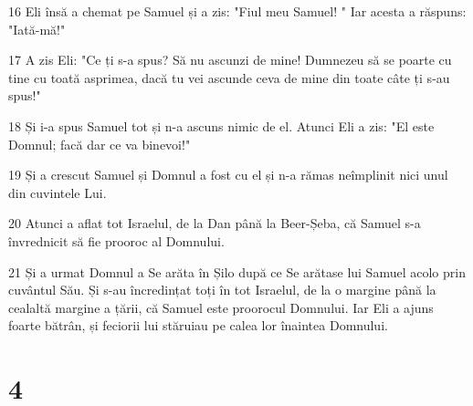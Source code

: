 \par 16 Eli însă a chemat pe Samuel și a zis: "Fiul meu Samuel! " Iar acesta a răspuns: "Iată-mă!"
\par 17 A zis Eli: "Ce ți s-a spus? Să nu ascunzi de mine! Dumnezeu să se poarte cu tine cu toată asprimea, dacă tu vei ascunde ceva de mine din toate câte ți s-au spus!"
\par 18 Și i-a spus Samuel tot și n-a ascuns nimic de el. Atunci Eli a zis: "El este Domnul; facă dar ce va binevoi!"
\par 19 Și a crescut Samuel și Domnul a fost cu el și n-a rămas neîmplinit nici unul din cuvintele Lui.
\par 20 Atunci a aflat tot Israelul, de la Dan până la Beer-Șeba, că Samuel s-a învrednicit să fie prooroc al Domnului.
\par 21 Și a urmat Domnul a Se arăta în Șilo după ce Se arătase lui Samuel acolo prin cuvântul Său. Și s-au încredințat toți în tot Israelul, de la o margine până la cealaltă margine a țării, că Samuel este proorocul Domnului. Iar Eli a ajuns foarte bătrân, și feciorii lui stăruiau pe calea lor înaintea Domnului.

\chapter{4}

